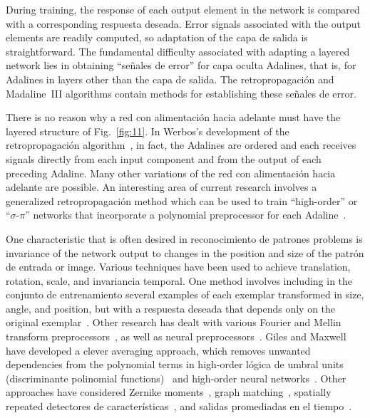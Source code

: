 \documentclass[10pt,twocolumn]{article}
\begin{document}
During training, the response of each output element in the network is compared
with a corresponding respuesta deseada. Error signals associated with the output
elements are readily computed, so adaptation of the capa de salida is
straightforward. The fundamental difficulty associated with adapting a layered
network lies in obtaining ``señales de error'' for capa oculta Adalines, that is,
for Adalines in layers other than the capa de salida. The retropropagación and
Madaline~III algorithms contain methods for establishing these señales de error.

There is no reason why a red con alimentación hacia adelante must have the layered structure of
Fig.~\ref{fig:11}. In Werbos's development of the retropropagación
algorithm~\cite{werbos}, in fact, the Adalines are ordered and each receives
signals directly from each input component and from the output of each preceding
Adaline. Many other variations of the red con alimentación hacia adelante are possible. An
interesting area of current research involves a generalized retropropagación
method which can be used to train ``high-order'' or ``$\sigma$-$\pi$'' networks
that incorporate a polynomial preprocessor for each Adaline~\cite{pdp,giles88}.

One characteristic that is often desired in reconocimiento de patrones problems is
invariance of the network output to changes in the position and size of the
patrón de entrada or image. Various techniques have been used to achieve
translation, rotation, scale, and invariancia temporal. One method involves including
in the conjunto de entrenamiento several examples of each exemplar transformed in size,
angle, and position, but with a respuesta deseada that depends only on the
original exemplar~\cite{widrow63}. Other research has dealt with various Fourier
and Mellin transform preprocessors~\cite{casasent,reber}, as well as neural
preprocessors~\cite{widrowwinter}. Giles and Maxwell have developed a clever
averaging approach, which removes unwanted dependencies from the polynomial
terms in high-order lógica de umbral units (discriminante polinomial
functions)~\cite{giles87} and high-order neural networks~\cite{giles88}. Other
approaches have considered Zernike moments~\cite{khotanzad}, graph
matching~\cite{malsburg88}, spatially repeated detectores de características~\cite{fuku80},
and salidas promediadas en el tiempo~\cite{waibel}.
\end{document}
